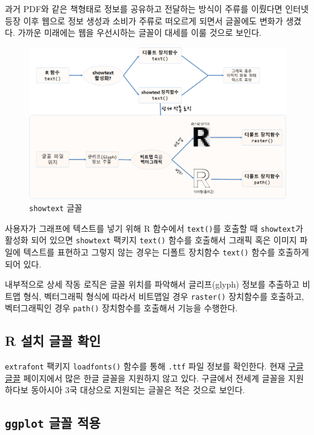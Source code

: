 \documentclass[
]{book}
\begin{document}
과거 PDF와 같은 책형태로 정보를 공유하고 전달하는 방식이 주류를 이뤘다면
인터넷 등장 이후 웹으로 정보 생성과 소비가 주류로 떠오르게 되면서 글꼴에도
변화가 생겼다. 가까운 미래에는 웹을 우선시하는 글꼴이 대세를 이룰 것으로 보인다.

\begin{figure}
\centering
\includegraphics[width=1\textwidth,height=\textheight]{assets/images/font-showtext.png}
\caption{\texttt{showtext} 글꼴}
\end{figure}

사용자가 그래프에 텍스트를 넣기 위해 R 함수에서 \texttt{text()}를 호출할 때
\texttt{showtext}가 활성화 되어 있으면 \texttt{showtext} 팩키지 \texttt{text()} 함수를
호출해서 그래픽 혹은 이미지 파일에 텍스트를 표현하고 그렇지 않는 경우는
디폴트 장치함수 \texttt{text()} 함수를 호출하게 되어 있다.

내부적으로 상세 작동 로직은 글꼴 위치를 파악해서 글리프(glyph) 정보를
추출하고 비트맵 형식, 벡터그래픽 형식에 따라서 비트맵일 경우 \texttt{raster()}
장치함수를 호출하고, 벡터그래픽인 경우 \texttt{path()} 장치함수를 호출해서
기능을 수행한다.

\hypertarget{showtext-korean-example}{%
\subsection{R 설치 글꼴 확인}\label{showtext-korean-example}}

\texttt{extrafont} 팩키지 \texttt{loadfonts()} 함수를 통해 \texttt{.ttf} 파일 정보를
확인한다. 현재 \href{http://www.google.com/fonts}{구글 글끌} 페이지에서 많은 한글
글꼴을 지원하지 않고 있다. 구글에서 전세계 글꼴을 지원하다보 동아시아 3국 대상으로
지원되는 글꼴은 적은 것으로 보인다.

\hypertarget{font-showtext-korean-example-ggplot}{%
\subsection{\texorpdfstring{\texttt{ggplot} 글꼴 적용}{ggplot 글꼴 적용}}\label{font-showtext-korean-example-ggplot}}
\end{document}
